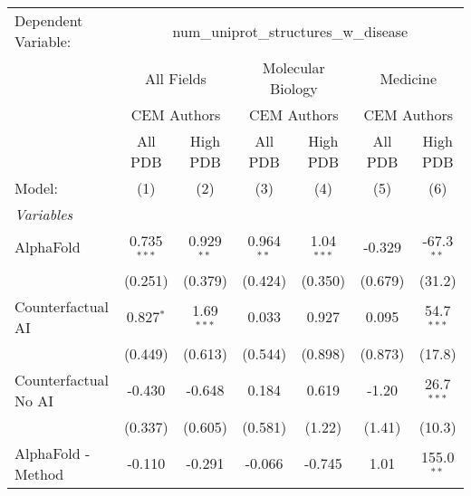 \begingroup
\centering
\begin{tabular}{lcccccc}
   \tabularnewline \midrule \midrule
   Dependent Variable: & \multicolumn{6}{c}{num\_uniprot\_structures\_w\_disease}\\
 & \multicolumn{2}{c}{All Fields} & \multicolumn{2}{c}{Molecular Biology} & \multicolumn{2}{c}{Medicine} \\
\cmidrule(lr){2-3} \cmidrule(lr){4-5} \cmidrule(lr){6-7}
 & \multicolumn{2}{c}{CEM Authors} & \multicolumn{2}{c}{CEM Authors} & \multicolumn{2}{c}{CEM Authors} \\
\cmidrule(lr){2-3} \cmidrule(lr){4-5} \cmidrule(lr){6-7}
 & \multicolumn{1}{c}{All PDB} & \multicolumn{1}{c}{High PDB} & \multicolumn{1}{c}{All PDB} & \multicolumn{1}{c}{High PDB} & \multicolumn{1}{c}{All PDB} & \multicolumn{1}{c}{High PDB} \\
\cmidrule(lr){2-2} \cmidrule(lr){3-3} \cmidrule(lr){4-4} \cmidrule(lr){5-5} \cmidrule(lr){6-6} \cmidrule(lr){7-7}
   Model:                                                     & (1)           & (2)          & (3)           & (4)          & (5)           & (6)\\  
   \midrule
   \emph{Variables}\\
   AlphaFold                                                  & 0.735$^{***}$ & 0.929$^{**}$ & 0.964$^{**}$  & 1.04$^{***}$ & -0.329        & -67.3$^{**}$\\   
                                                              & (0.251)       & (0.379)      & (0.424)       & (0.350)      & (0.679)       & (31.2)\\   
   Counterfactual AI                                          & 0.827$^{*}$   & 1.69$^{***}$ & 0.033         & 0.927        & 0.095         & 54.7$^{***}$\\   
                                                              & (0.449)       & (0.613)      & (0.544)       & (0.898)      & (0.873)       & (17.8)\\   
   Counterfactual No AI                                       & -0.430        & -0.648       & 0.184         & 0.619        & -1.20         & 26.7$^{***}$\\   
                                                              & (0.337)       & (0.605)      & (0.581)       & (1.22)       & (1.41)        & (10.3)\\   
   AlphaFold - Method                                         & -0.110        & -0.291       & -0.066        & -0.745       & 1.01          & 155.0$^{**}$\\   

\end{tabular}
